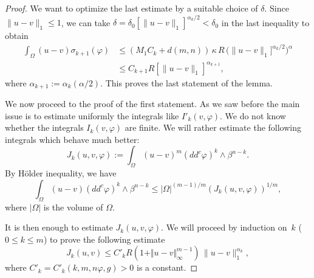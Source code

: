 \begin{proof}
We want to optimize the last estimate by a suitable choice of $\delta$. Since $ \|u-v\|_1 \leq 1$, we can take $\delta= \delta_0 [\|u-v\|_1]^{\alpha_k\slash 2} < \delta_0$ in the last inequality to obtain
\begin{align*}
\int_{\Omega}(u-v) \sigma_{k+1}(\varphi) &\leq  (M_1 C_k
+ d (m,n))\, \kappa \, R \, \bigl(\|u-v\|_1]^{\alpha_k \slash 2} \bigr)^{\alpha } \\
& \leq C_{k + 1} R [\|u-v\|_1]^{\alpha_{k+ 1}},
\end{align*}
where $\alpha_{k + 1} := \alpha_k (\alpha \slash 2)$.
This proves the last statement of the lemma.

We now proceed to the proof of the first statement.
As we saw before the main issue is to estimate uniformly the integrals like $ I'_k (v,\varphi)$.
We do not know whether the integrals $I_k (v,\varphi)$ are finite. We will rather estimate the following integrals which behave much better:
\[
J_{k} (u,v,\varphi) := \int_{\Omega} (u-v)^m (dd^c \varphi)^{k} \wedge \beta^{n -k }.
\]
By Hölder inequality, we have
\begin{equation} \label{eq:Hineq2}
\int_\Omega (u-v) (dd^c \varphi)^k \wedge \beta^{n-k} \leq \vert \Omega\vert^{ (m-1) \slash m}\left(J_k (u,v,\varphi)\right)^{1 \slash m},
\end{equation}
where $\vert \Omega\vert$ is the volume of $\Omega$.

It is then enough to estimate $J_k (u,v,\varphi)$. We will proceed by induction on~$k$ \hbox{($0 \leq k \leq m$)} to prove the following estimate
\begin{equation} \label{eq:Jk}
J_k (u,v) \leq C'_k R (1 + \Vert u - v\Vert_{\infty}^{m -1} ) \, \|u-v\|_1^{\alpha_k},
\end{equation}
where $C'_k = C'_k (k,m,n\varphi,g) > 0$ is a constant.


\end{proof}

